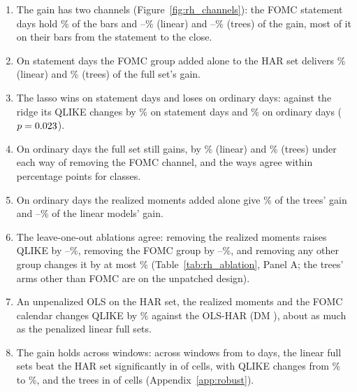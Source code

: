 \begin{enumerate}
  against \rhorSubARoosHar\%) and lower it in \rhorSubBLabel{} (\rhorSubBRoosAfMin--\rhorSubBRoosAfMax\% against
  \rhorSubBRoosHar\%).
\item The gain has two channels (Figure~\ref{fig:rh_channels}): the FOMC statement days hold \rhchEventBarPct\% of the
  bars and \rhchLinShareEventMin--\rhchLinShareEventMax\% (linear) and \rhchTreeShareEventMin--\rhchTreeShareEventMax\%
  (trees) of the gain, most of it on their bars from the statement to the close.
\item On statement days the FOMC group added alone to the HAR set delivers \rhchEvFomcShareLinRng\% (linear) and
  \rhchEvFomcShareTreeRng\% (trees) of the full set's gain.
\item The lasso wins on statement days and loses on ordinary days: against the ridge its QLIKE changes by
  \rhchLassoRidgeEventPct\% on statement days and \rhchLassoRidgeOrdPct\% on ordinary days ($p = 0.023$).
\item On ordinary days the full set still gains, by \rhchCorrLinRng\% (linear) and \rhchCorrTreeRng\% (trees) under
  each way of removing the FOMC channel, and the ways agree within \rhchAgreePp{} percentage points for
  \rhchNCorrAgree{} classes.
\item On ordinary days the realized moments added alone give \rhchOrdRmShareTreeRng\% of the trees' gain and
  \rhchXEnetOrdRmVsHarShare--\rhchXLassoOrdRmVsHarShare\% of the linear models' gain.
\item The leave-one-out ablations agree: removing the realized moments raises QLIKE by
  \rhabLoRmAllPctMin--\rhabLoRmAllPctMax\%, removing the FOMC group by \rhabLoFomcAllPctMin--\rhabLoFomcAllPctMax\%, and
  removing any other group changes it by at most \rhabLoOtherAllMaxAbs\% (Table~\ref{tab:rh_ablation}, Panel A; the
  trees' arms other than FOMC are on the unpatched design).
\item An unpenalized OLS on the HAR set, the realized moments and the FOMC calendar changes QLIKE by
  \rhabOlsAddRmFomcVsHarAllPct\% against the OLS-HAR (DM \rhabOlsAddRmFomcVsHarAllDm), about as much as the penalized
  linear full sets.
\item The gain holds across windows: across \rhwsNWinWord{} windows from \rhwsWinMin{} to \rhwsWinMax{} days,
  the linear full sets beat the HAR set significantly in \rhwsBarNSigAll{} of \rhwsNCells{} cells, with
  QLIKE changes from \rhwsBarPctMin\% to \rhwsBarPctMax\%, and the trees in \rhlcNGapSigBar{} of \rhlcNGapCellsBar{} cells
  (Appendix~\ref{app:robust}).
\end{enumerate}

